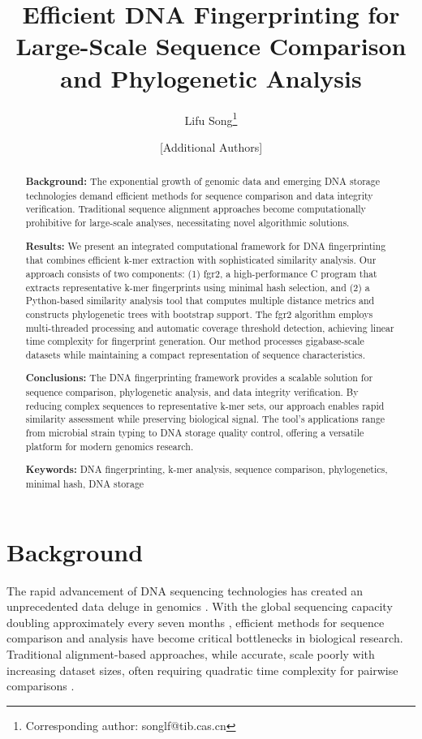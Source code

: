 \documentclass[12pt,a4paper]{article}
\title{Efficient DNA Fingerprinting for Large-Scale Sequence Comparison and Phylogenetic Analysis}
\author[1]{Lifu Song\thanks{Corresponding author: songlf@tib.cas.cn}}
\author[2]{[Additional Authors]}
\affil[1]{Tianjin Institute of Industrial Biotechnology, Chinese Academy of Sciences, Tianjin, China}
\affil[2]{[Additional Affiliations]}
\date{}
\begin{document}
\maketitle

\begin{abstract}
\textbf{Background:} The exponential growth of genomic data and emerging DNA storage technologies demand efficient methods for sequence comparison and data integrity verification. Traditional sequence alignment approaches become computationally prohibitive for large-scale analyses, necessitating novel algorithmic solutions.

\textbf{Results:} We present an integrated computational framework for DNA fingerprinting that combines efficient k-mer extraction with sophisticated similarity analysis. Our approach consists of two components: (1) fgr2, a high-performance C program that extracts representative k-mer fingerprints using minimal hash selection, and (2) a Python-based similarity analysis tool that computes multiple distance metrics and constructs phylogenetic trees with bootstrap support. The fgr2 algorithm employs multi-threaded processing and automatic coverage threshold detection, achieving linear time complexity for fingerprint generation. Our method processes gigabase-scale datasets while maintaining a compact representation of sequence characteristics.

\textbf{Conclusions:} The DNA fingerprinting framework provides a scalable solution for sequence comparison, phylogenetic analysis, and data integrity verification. By reducing complex sequences to representative k-mer sets, our approach enables rapid similarity assessment while preserving biological signal. The tool's applications range from microbial strain typing to DNA storage quality control, offering a versatile platform for modern genomics research.

\textbf{Keywords:} DNA fingerprinting, k-mer analysis, sequence comparison, phylogenetics, minimal hash, DNA storage
\end{abstract}

\section{Background}

The rapid advancement of DNA sequencing technologies has created an unprecedented data deluge in genomics \citep{stephens2015big}. With the global sequencing capacity doubling approximately every seven months \citep{shendure2017dna}, efficient methods for sequence comparison and analysis have become critical bottlenecks in biological research. Traditional alignment-based approaches, while accurate, scale poorly with increasing dataset sizes, often requiring quadratic time complexity for pairwise comparisons \citep{edgar2010search}.
\end{document}
